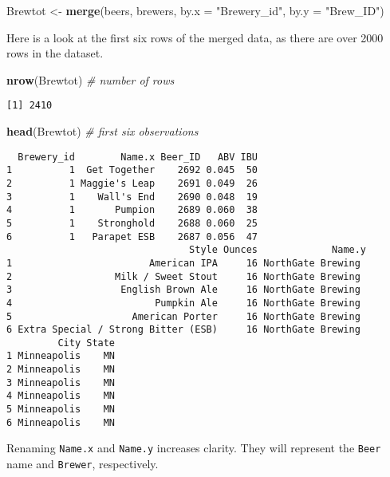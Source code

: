 \documentclass[]{article}
\newenvironment{Shaded}{\begin{snugshade}}{\end{snugshade}}
\newcommand{\CommentTok}[1]{\textcolor[rgb]{0.56,0.35,0.01}{\textit{#1}}}
\newcommand{\DataTypeTok}[1]{\textcolor[rgb]{0.13,0.29,0.53}{#1}}
\newcommand{\KeywordTok}[1]{\textcolor[rgb]{0.13,0.29,0.53}{\textbf{#1}}}
\newcommand{\NormalTok}[1]{#1}
\newcommand{\StringTok}[1]{\textcolor[rgb]{0.31,0.60,0.02}{#1}}
\begin{document}
\begin{Shaded}
\begin{Highlighting}[]
\NormalTok{Brewtot <-}\StringTok{ }\KeywordTok{merge}\NormalTok{(beers, brewers, }\DataTypeTok{by.x =} \StringTok{"Brewery_id"}\NormalTok{, }\DataTypeTok{by.y =} \StringTok{"Brew_ID"}\NormalTok{)}
\end{Highlighting}
\end{Shaded}

Here is a look at the first six rows of the merged data, as there are
over 2000 rows in the dataset.

\begin{Shaded}
\begin{Highlighting}[]
\KeywordTok{nrow}\NormalTok{(Brewtot) }\CommentTok{# number of rows}
\end{Highlighting}
\end{Shaded}

\begin{verbatim}
[1] 2410
\end{verbatim}

\begin{Shaded}
\begin{Highlighting}[]
\KeywordTok{head}\NormalTok{(Brewtot) }\CommentTok{# first six observations}
\end{Highlighting}
\end{Shaded}

\begin{verbatim}
  Brewery_id        Name.x Beer_ID   ABV IBU
1          1  Get Together    2692 0.045  50
2          1 Maggie's Leap    2691 0.049  26
3          1    Wall's End    2690 0.048  19
4          1       Pumpion    2689 0.060  38
5          1    Stronghold    2688 0.060  25
6          1   Parapet ESB    2687 0.056  47
                                Style Ounces             Name.y
1                        American IPA     16 NorthGate Brewing 
2                  Milk / Sweet Stout     16 NorthGate Brewing 
3                   English Brown Ale     16 NorthGate Brewing 
4                         Pumpkin Ale     16 NorthGate Brewing 
5                     American Porter     16 NorthGate Brewing 
6 Extra Special / Strong Bitter (ESB)     16 NorthGate Brewing 
         City State
1 Minneapolis    MN
2 Minneapolis    MN
3 Minneapolis    MN
4 Minneapolis    MN
5 Minneapolis    MN
6 Minneapolis    MN
\end{verbatim}

Renaming \texttt{Name.x} and \texttt{Name.y} increases clarity. They
will represent the \texttt{Beer} name and \texttt{Brewer}, respectively.
\end{document}

